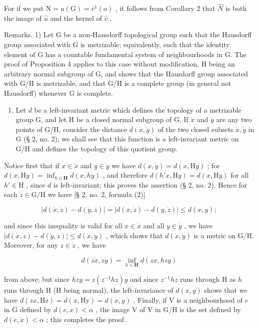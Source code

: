 For if we put \(\mathrm{N} = u(\mathrm{G}) = \overline{v}^{1}(\mathrm{o})\) , it follows from Corollary 2 that \(\hat{N}\) is both the image of \(\hat{u}\) and the kernel of \(\hat{v}\) .

Remarks. 1) Let G be a non-Hausdorff topological group such that the Hausdorff group associated with G is metrizable; equivalently, such that the identity element of G has a countable fundamental system of neighbourhoods in G. The proof of Proposition 4 applies to this case without modification, H being an arbitrary normal subgroup of G, and shows that the Hausdorff group associated with G/H is metrizable, and that G/H is a complete group (in general not Hausdorff) whenever G is complete.

\begin{enumerate}
\def\labelenumi{\arabic{enumi})}
\setcounter{enumi}{1}
\tightlist
\item
  Let \(d\) be a left-invariant metric which defines the topology of a metrizable group G, and let H be a closed normal subgroup of G. If \(\dot{x}\) and \(\dot{y}\) are any two points of G/H, consider the distance \(d(\dot{x},\dot{y})\) of the two closed subsets \(\dot{x},\dot{y}\) in G (§ 2, no. 2); we shall see that this function is a left-invariant metric on G/H and defines the topology of this quotient group.
\end{enumerate}

Notice first that if \(x \in \dot{x}\) and \(y \in \dot{y}\) we have \(d(\dot{x}, \dot{y}) = d(x, \mathrm{H}y)\) ; for \(d(x, \mathrm{H}y) = \inf_{h \in \mathbf{H}} d(x, h y)\) , and therefore \(d(h' x, \mathrm{H} y) = d(x, \mathrm{H} y)\) for all \(h' \in \mathrm{H}\) , since \(d\) is left-invariant; this proves the assertion (§ 2, no. 2). Hence for each \(\dot{z} \in \mathrm{G} / \mathrm{H}\) we have {[}§ 2, no. 2, formula (2){]}

\[
\left| d (\dot {x}, \dot {z}) - d (\dot {y}, \dot {z}) \right| = \left| d (x, \dot {z}) - d (y, \dot {z}) \right| \leqslant d (x, y);
\]

and since this inequality is valid for all \(x \in \dot{x}\) and all \(y \in \dot{y}\) , we have \(|d(\dot{x}, \dot{z}) - d(\dot{y}, \dot{z})| \leqslant d(\dot{x}, \dot{y})\) , which shows that \(d(\dot{x}, \dot{y})\) is a metric on G/H. Moreover, for any \(z \in \dot{z}\) , we have

\[
d (\dot {z} \dot {x}, \dot {z} \dot {y}) = \inf _ {h \in \mathbf {H}} d (z x, h z y)
\]

from above; but since \(hzy = z(z^{-1}hz)y\) and since \(z^{-1}hz\) runs through H as \(h\) runs through H (H being normal), the left-invariance of \(d(x,y)\) shows that we have \(d(zx, \mathrm{Hz}) = d(x, \mathrm{Hy}) = d(\dot{x}, \dot{y})\) . Finally, if V is a neighbourhood of \(e\) in G defined by \(d(e, x) < \alpha\) , the image V of V in G/H is the set defined by \(d(\dot{e}, \dot{x}) < \alpha\) ; this completes the proof.

